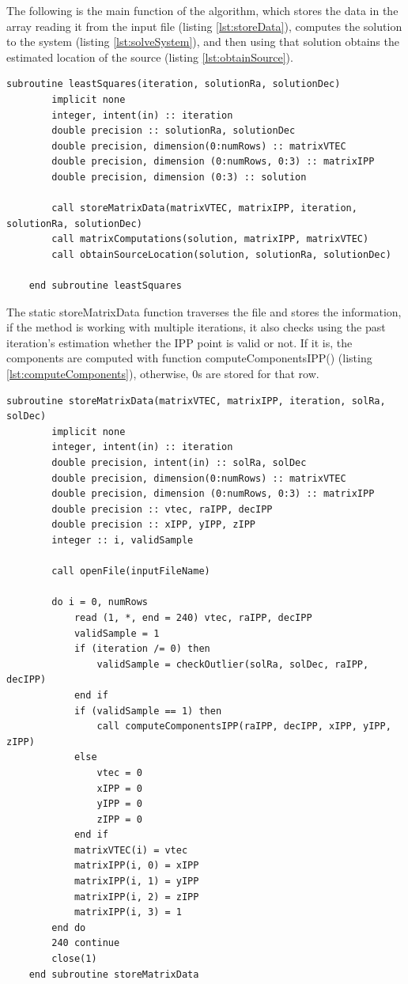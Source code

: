 The following is the main function of the algorithm, which stores the data in the array reading it from the input file (listing \ref{lst:storeData}), computes the solution to the system (listing \ref{lst:solveSystem}), and then using that solution obtains the estimated location of the source (listing \ref{lst:obtainSource}). \\

\begin{minipage}{\linewidth}
	\label{lst:main}
	\begin{lstlisting}[style=myFortranStyle, caption=Main Least Squares function]
	subroutine leastSquares(iteration, solutionRa, solutionDec)
		implicit none
		integer, intent(in) :: iteration
		double precision :: solutionRa, solutionDec
		double precision, dimension(0:numRows) :: matrixVTEC
		double precision, dimension (0:numRows, 0:3) :: matrixIPP
		double precision, dimension (0:3) :: solution
		
		call storeMatrixData(matrixVTEC, matrixIPP, iteration, solutionRa, solutionDec)
		call matrixComputations(solution, matrixIPP, matrixVTEC)
		call obtainSourceLocation(solution, solutionRa, solutionDec)
	
	end subroutine leastSquares\end{lstlisting}
\end{minipage}

The static storeMatrixData function traverses the file and stores the information, if the method is working with multiple iterations, it also checks using the past iteration's estimation whether the IPP point is valid or not. If it is, the components are computed with function computeComponentsIPP() (listing \ref{lst:computeComponents}), otherwise, 0s are stored for that row.

\begin{minipage}{\linewidth}
	\label{lst:storeData}
	\begin{lstlisting}[style=myFortranStyle, caption=Storing the data from the input file]
	subroutine storeMatrixData(matrixVTEC, matrixIPP, iteration, solRa, solDec)
		implicit none
		integer, intent(in) :: iteration
		double precision, intent(in) :: solRa, solDec
		double precision, dimension(0:numRows) :: matrixVTEC
		double precision, dimension (0:numRows, 0:3) :: matrixIPP
		double precision :: vtec, raIPP, decIPP
		double precision :: xIPP, yIPP, zIPP
		integer :: i, validSample
		
		call openFile(inputFileName)
		
		do i = 0, numRows
			read (1, *, end = 240) vtec, raIPP, decIPP
			validSample = 1
			if (iteration /= 0) then
				validSample = checkOutlier(solRa, solDec, raIPP, decIPP)
			end if
			if (validSample == 1) then
				call computeComponentsIPP(raIPP, decIPP, xIPP, yIPP, zIPP)
			else
				vtec = 0
				xIPP = 0
				yIPP = 0
				zIPP = 0
			end if
			matrixVTEC(i) = vtec
			matrixIPP(i, 0) = xIPP
			matrixIPP(i, 1) = yIPP
			matrixIPP(i, 2) = zIPP
			matrixIPP(i, 3) = 1
		end do
		240 continue
		close(1)
	end subroutine storeMatrixData\end{lstlisting}
\end{minipage}

